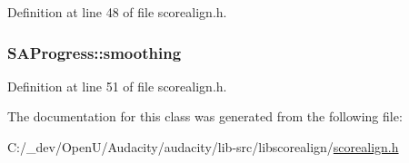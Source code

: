 Definition at line 48 of file scorealign.\+h.

\subsubsection[{\texorpdfstring{smoothing}{smoothing}}]{ S\+A\+Progress\+::smoothing\hspace{0.3cm}{\ttfamily [protected]}}\hypertarget{class_s_a_progress_a585c8d96cef282f514cadeffffd867fe}{}\label{class_s_a_progress_a585c8d96cef282f514cadeffffd867fe}


Definition at line 51 of file scorealign.\+h.



The documentation for this class was generated from the following file\+:\begin{DoxyCompactItemize}
\item 
C\+:/\+\_\+dev/\+Open\+U/\+Audacity/audacity/lib-\/src/libscorealign/\hyperlink{scorealign_8h}{scorealign.\+h}\end{DoxyCompactItemize}
